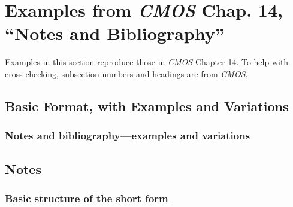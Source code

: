 \documentclass[11pt,letterpaper,oneside]{article}
\begin{document}
\section{Examples from \emph{CMOS} Chap. 14, ``Notes and
Bibliography''}
\label{notes}

Examples in this section reproduce those in \textit{CMOS} Chapter 14.
To help with cross-checking, subsection numbers and headings are from
\textit{CMOS}.

\subsection{Basic Format, with Examples and Variations}
\setcounter{subsection}{14}

\setcounter{subsubsection}{22}
\subsubsection{Notes and bibliography—examples and variations}
\label{14.23}

\begin{citebib}
\item \cite[87-88]{strayed2012}
\item \cite[261, 265]{strayed2012}
\item \cite[32]{daum2015}
\item \cite[134--35]{daum2015}
\item \cite[188]{grazer2015}
\item \cite[190]{grazer2015}
\item \cite[242--55]{garcia1988}
\item \cite[33]{garcia1988}
\item \cite[310]{gould1984a}
\item \cite[309]{gould1984a}
\item \cite[484--85]{bagley2015}
\item \cite[501]{bagley2015}
\item \cite[311]{liu2015}
\item \cite[312]{liu2015}
\end{citebib}

\setcounter{subsection}{1}
\subsection{Notes}
\setcounter{subsection}{14}

\setcounter{subsubsection}{29}
\subsubsection{Basic structure of the short form}
\label{14.30}
\end{document}
